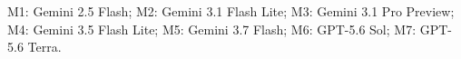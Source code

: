 M1: Gemini 2.5 Flash; M2: Gemini 3.1 Flash Lite; M3: Gemini 3.1 Pro Preview; M4: Gemini 3.5 Flash Lite; M5: Gemini 3.7 Flash; M6: GPT-5.6 Sol; M7: GPT-5.6 Terra.
